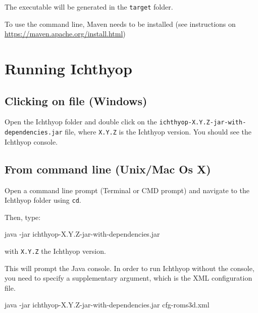 \documentclass[
  letterpaper,
  DIV=11,
  numbers=noendperiod]{scrreprt}
\newenvironment{Shaded}{\begin{snugshade}}{\end{snugshade}}
\newcommand{\AttributeTok}[1]{\textcolor[rgb]{0.40,0.45,0.13}{#1}}
\newcommand{\ExtensionTok}[1]{\textcolor[rgb]{0.00,0.23,0.31}{#1}}
\newcommand{\NormalTok}[1]{\textcolor[rgb]{0.00,0.23,0.31}{#1}}
\begin{document}
The executable will be generated in the \texttt{target} folder.

To use the command line, Maven needs to be installed (see instructions
on \url{https://maven.apache.org/install.html})

\section{Running Ichthyop}\label{running-ichthyop}

\subsection{Clicking on file (Windows)}\label{clicking-on-file-windows}

Open the Ichthyop folder and double click on the
\texttt{ichthyop-X.Y.Z-jar-with-dependencies.jar} file, where
\texttt{X.Y.Z} is the Ichthyop version. You should see the Ichthyop
console.

\subsection{From command line (Unix/Mac Os
X)}\label{from-command-line-unixmac-os-x}

Open a command line prompt (Terminal or CMD prompt) and navigate to the
Ichthyop folder using \texttt{cd}.

Then, type:

\begin{Shaded}
\begin{Highlighting}[]
\ExtensionTok{java} \AttributeTok{{-}jar}\NormalTok{ ichthyop{-}X.Y.Z{-}jar{-}with{-}dependencies.jar}
\end{Highlighting}
\end{Shaded}

with \texttt{X.Y.Z} the Ichthyop version.

This will prompt the Java console. In order to run Ichthyop without the
console, you need to specify a supplementary argument, which is the XML
configuration file.

\begin{Shaded}
\begin{Highlighting}[]
\ExtensionTok{java} \AttributeTok{{-}jar}\NormalTok{ ichthyop{-}X.Y.Z{-}jar{-}with{-}dependencies.jar cfg{-}roms3d.xml}
\end{Highlighting}
\end{Shaded}

\end{document}
